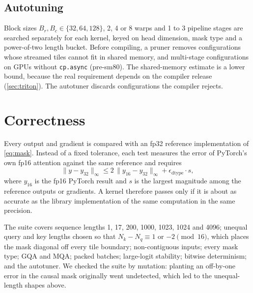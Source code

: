 \documentclass[10pt,twocolumn,letterpaper]{article}
\begin{document}
\subsection{Autotuning}
Block sizes $B_r, B_c \in \{32, 64, 128\}$, 2, 4 or 8 warps and 1 to 3
pipeline stages are searched separately for each kernel, keyed on head
dimension, mask type and a power-of-two length bucket. Before compiling, a
pruner removes configurations whose streamed tiles cannot fit in shared
memory, and multi-stage configurations on GPUs without \texttt{cp.async}
(pre-sm80). The shared-memory estimate is a lower bound, because the real
requirement depends on the compiler release (\cref{sec:triton}). The
autotuner discards configurations the compiler rejects.

\section{Correctness}
\label{sec:correct}

Every output and gradient is compared with an fp32 reference implementation
of \cref{eq:mask}. Instead of a fixed tolerance, each test measures the error
of PyTorch's own fp16 attention against the same reference and requires
\begin{equation}
\| y - y_{32} \|_\infty \le 2\, \| y_{16} - y_{32} \|_\infty + \epsilon_{\mathrm{dtype}} \cdot s,
\label{eq:tol}
\end{equation}
where $y_{16}$ is the fp16 PyTorch result and $s$ is the largest magnitude
among the reference outputs or gradients. A kernel therefore passes only if
it is about as accurate as the library implementation of the same
computation in the same precision.

The suite covers sequence lengths 1, 17, 200, 1000, 1023, 1024 and 4096;
unequal query and key lengths chosen so that $N_k - N_q \equiv 1$ or
$-2 \pmod{16}$, which places the mask diagonal off every tile boundary;
non-contiguous inputs; every mask type; GQA and MQA; packed batches;
large-logit stability; bitwise determinism; and the autotuner. We checked
the suite by mutation: planting an off-by-one error in the causal mask
originally went undetected, which led to the unequal-length shapes above.
\end{document}
